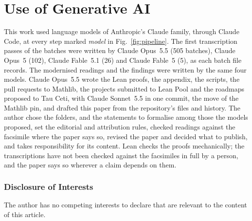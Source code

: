 \documentclass[runningheads,a4paper]{llncs}
\providecommand{\discintname}{Disclosure of Interests}
\begin{document}
\section*{Use of Generative AI}

This work used language models of Anthropic's Claude family, through Claude Code, at every step marked \emph{model} in Fig.~\ref{fig:pipeline}. The first transcription passes of the \cntBatches{} batches were written by Claude Opus~5.5 (505 batches), Claude Opus~5 (102), Claude Fable~5.1 (26) and Claude Fable~5 (5), as each batch file records. The modernised readings and the findings were written by the same four models. Claude Opus~5.5 wrote the Lean proofs, the appendix, the scripts, the pull requests to Mathlib, the projects submitted to Lean Pool and the roadmaps proposed to Tau Ceti, with Claude Sonnet~5.5 in one commit, the move of the Mathlib pin, and drafted this paper from the repository's files and history. The author chose the folders, and the statements to formalise among those the models proposed, set the editorial and attribution rules, checked readings against the facsimile where the paper says so, revised the paper and decided what to publish, and takes responsibility for its content. Lean checks the proofs mechanically; the transcriptions have not been checked against the facsimiles in full by a person, and the paper says so wherever a claim depends on them.

\begin{credits}
\subsubsection{\discintname}
The author has no competing interests to declare that are relevant to the content of this article.
\end{credits}



\end{document}
